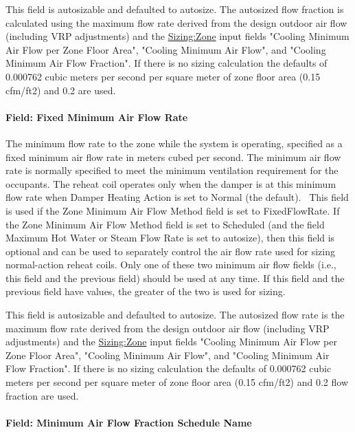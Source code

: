 This field is autosizable and defaulted to autosize. The autosized flow fraction is calculated using the maximum flow rate derived from the design outdoor air flow (including VRP adjustments) and the \hyperref[sizingzone]{Sizing:Zone} input fields "Cooling Minimum Air Flow per Zone Floor Area", "Cooling Minimum Air Flow", and "Cooling Minimum Air Flow Fraction". If there is no sizing calculation the defaults of 0.000762 cubic meters per second per square meter of zone floor area (0.15 cfm/ft2) and 0.2 are used.

\paragraph{Field: Fixed Minimum Air Flow Rate}\label{field-fixed-minimum-air-flow-rate}

The minimum flow rate to the zone while the system is operating, specified as a fixed minimum air flow rate in meters cubed per second. The minimum air flow rate is normally specified to meet the minimum ventilation requirement for the occupants. The reheat coil operates only when the damper is at this minimum flow rate when Damper Heating Action is set to Normal (the default).~ This field is used if the Zone Minimum Air Flow Method field is set to FixedFlowRate. If the Zone Minimum Air Flow Method field is set to Scheduled (and the field Maximum Hot Water or Steam Flow Rate is set to autosize), then this field is optional and can be used to separately control the air flow rate used for sizing normal-action reheat coils. Only one of these two minimum air flow fields (i.e., this field and the previous field) should be used at any time. If this field and the previous field have values, the greater of the two is used for sizing.

This field is autosizable and defaulted to autosize. The autosized flow rate is the maximum flow rate derived from the design outdoor air flow (including VRP adjustments) and the \hyperref[sizingzone]{Sizing:Zone} input fields "Cooling Minimum Air Flow per Zone Floor Area", "Cooling Minimum Air Flow", and "Cooling Minimum Air Flow Fraction". If there is no sizing calculation the defaults of 0.000762 cubic meters per second per square meter of zone floor area (0.15 cfm/ft2) and 0.2 flow fraction are used.

\paragraph{Field: Minimum Air Flow Fraction Schedule Name}\label{field-minimum-air-flow-fraction-schedule-name}

